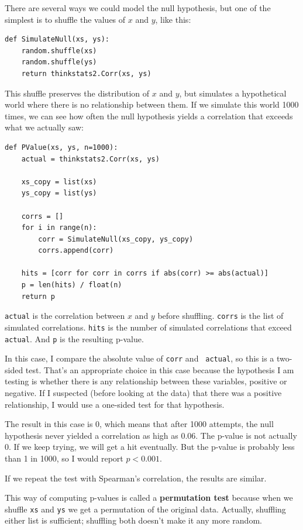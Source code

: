 \documentclass[12pt]{book}
\begin{document}
There are several ways we could model the null hypothesis, but one of the
simplest is to shuffle the values of $x$ and $y$, like this:

\begin{verbatim}
def SimulateNull(xs, ys):
    random.shuffle(xs)
    random.shuffle(ys)
    return thinkstats2.Corr(xs, ys)
\end{verbatim}

This shuffle preserves the distribution of $x$ and $y$, but simulates
a hypothetical world where there is no relationship between them.
If we simulate this world 1000 times, we can see how often the null
hypothesis yields a correlation that exceeds what we actually saw:

\begin{verbatim}
def PValue(xs, ys, n=1000):
    actual = thinkstats2.Corr(xs, ys)

    xs_copy = list(xs)
    ys_copy = list(ys)

    corrs = []
    for i in range(n):
        corr = SimulateNull(xs_copy, ys_copy)
        corrs.append(corr)

    hits = [corr for corr in corrs if abs(corr) >= abs(actual)]
    p = len(hits) / float(n)
    return p
\end{verbatim}

{\tt actual} is the correlation between $x$ and $y$ before shuffling.
{\tt corrs} is the list of simulated correlations.  {\tt hits} is
the number of simulated correlations that exceed {\tt actual}.
And {\tt p} is the resulting p-value.

In this case, I compare the absolute value of {\tt corr} and {\tt
  actual}, so this is a two-sided test.  That's an appropriate choice
in this case because the hypothesis I am testing is whether there is
any relationship between these variables, positive or negative.  If I
suspected (before looking at the data) that there was a positive
relationship, I would use a one-sided test for that hypothesis.

The result in this case is 0, which means that after 1000 attempts,
the null hypothesis never yielded a correlation as high as 0.06.
The p-value is not actually 0.  If we keep trying, we will get a hit
eventually.  But the p-value is probably less than
1 in 1000, so I would report $p < 0.001$.

If we repeat the test with Spearman's correlation, the results are
similar.

This way of computing p-values is called a {\bf permutation test} because
when we shuffle {\tt xs} and {\tt ys} we get a permutation of the
original data.  Actually, shuffling either list is sufficient; shuffling
both doesn't make it any more random.
\end{document}
